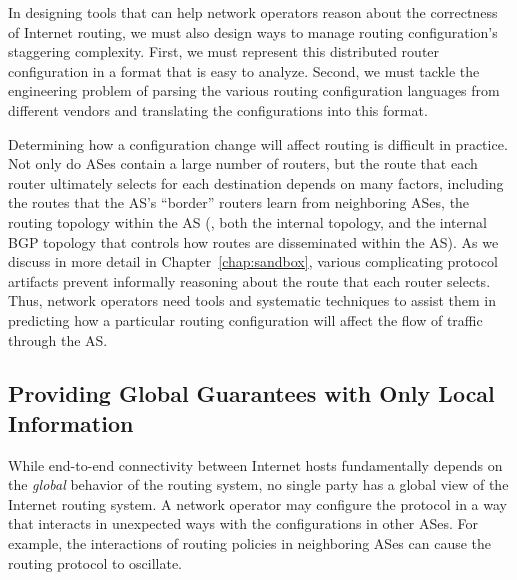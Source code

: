 
In designing tools that can help network operators reason
about the correctness of Internet routing, we must also design ways
to manage routing configuration's staggering complexity.  First, we must
represent this 
distributed router configuration in a format that is easy to analyze.
Second, we must tackle the engineering problem of parsing the various
routing configuration languages from different vendors and translating
the configurations into this format.

Determining how a configuration change will affect routing is difficult
in practice.  Not only do ASes contain a large number of routers, but
the route that each router ultimately selects for each destination
depends on many factors, including the routes that the AS's ``border''
routers learn from neighboring ASes, the routing topology within the AS
(\ie, both the internal topology, and the internal BGP topology that
controls how routes are disseminated within the AS).  As we discuss in
more detail in Chapter~\ref{chap:sandbox}, various complicating
protocol artifacts prevent informally reasoning about the route that each
router selects.  Thus, network operators need tools and
systematic techniques to assist them in predicting how a particular
routing configuration will affect the flow of traffic through the AS.


\subsection{Providing Global Guarantees with Only Local Information}

While end-to-end connectivity between Internet hosts fundamentally
depends on the {\em global} behavior of the routing system, no single party
has a global view of the Internet routing system. A network operator may
configure the protocol in a way that interacts in unexpected ways with
the configurations in other ASes.  For example, the interactions of
routing policies in neighboring ASes can cause the routing protocol to
oscillate.

